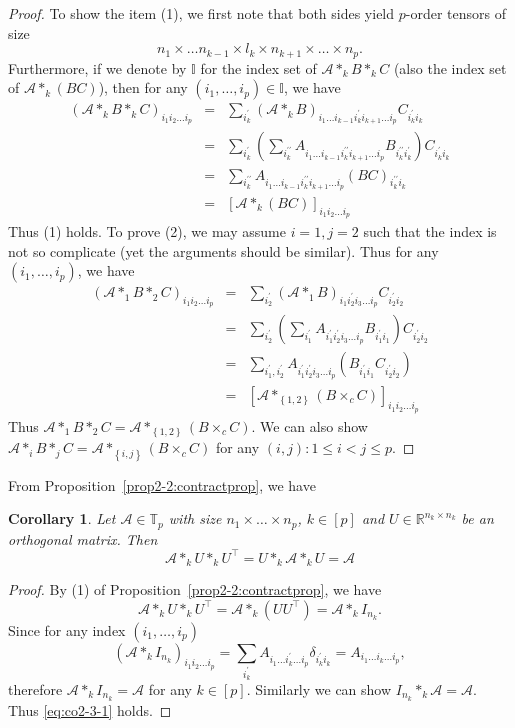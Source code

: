 \documentclass[11pt, oneside]{article}  %
\newtheorem{cor}[thm]{Corollary}
\newcommand{\set}[1]{\left\{#1\right\}}
\newcommand{\p}{\prime}
\newcommand{\bbI}{\mathbb{I}}
\newcommand{\RR}{\mathbb{R}}
\newcommand{\TT}{\mathbb{T}}
\newcommand{\A}{\mathcal{A}}
\newcommand{\beq}{\begin{equation}}
\newcommand{\eeq}{\end{equation}}
\newcommand{\beyy}{\begin{eqnarray*}}
\newcommand{\eeyy}{\end{eqnarray*}}
\begin{document}
\begin{proof}
To show the item (1), we first note that both sides yield $p$-order tensors of size 
\[ n_{1}\times\ldots n_{k-1}\times l_{k}\times n_{k+1}\times  \ldots \times n_{p}. \]
Furthermore, if we denote by $\bbI$ for the index set of $\A\ast_{k} B\ast_{k} C$ (also the index set of $\A\ast_{k} (BC)$), then for any 
$(i_{1},\ldots,i_{p})\in \bbI$, we have 
\beyy
(\A\ast_{k}B\ast_{k} C)_{i_{1}i_{2}\ldots i_{p}} 
&=& \sum_{i_{k}^{\p}}(\A\ast_{k}B)_{i_{1}\ldots i_{k-1}i_{k}^{\p}i_{k+1}\ldots i_{p}} C_{i_{k}^{\p}i_{k}}\\
&=& \sum_{i_{k}^{\p}}\left(\sum_{i_{k}^{\p\p}} A_{i_{1}\ldots i_{k-1}i_{k}^{\p\p}i_{k+1}\ldots i_{p}}
B_{i_{k}^{\p\p} i_{k}^{\p}} \right) C_{i_{k}^{\p}i_{k}}\\ 
&=&\sum_{i_{k}^{\p\p}} A_{i_{1}\ldots i_{k-1}i_{k}^{\p\p}i_{k+1}\ldots i_{p}} (BC)_{i_{k}^{\p\p}i_{k}}\\
& =&\left[ \A\ast_{k}(BC)\right]_{i_{1}i_{2}\ldots i_{p}} 
\eeyy
Thus (1) holds.  To prove (2), we may assume $i=1,j=2$ such that the index is not so complicate (yet the arguments should be similar).
Thus for any $(i_{1}, \ldots, i_{p})$, we have 
\beyy
(\A\ast_{1}B\ast_{2} C)_{i_{1}i_{2}\ldots i_{p}} 
&=&\sum_{i_{2}^{\p}}(\A\ast_{1}B)_{i_{1}i_{2}^{\p}i_{3}\ldots i_{p}}C_{i_{2}^{\p}i_{2}}\\
& =&\sum_{i_{2}^{\p}}\left( \sum_{i_{1}^{\p}} A_{i_{1}^{\p}i_{2}^{\p}i_{3}\ldots i_{p}} B_{i_{1}^{\p} i_{1}} \right) C_{i_{2}^{\p}i_{2}}\\
& =&\sum_{i_{1}^{\p},i_{2}^{\p}}A_{i_{1}^{\p}i_{2}^{\p}i_{3}\ldots i_{p}}\left( B_{i_{1}^{\p}i_{1}}C_{i_{2}^{\p}i_{2}}\right)\\
& =&\left[\A\ast_{\set{1,2}} (B\times_{c} C)\right]_{i_{1}i_{2}\ldots i_{p}}
\eeyy 
Thus $\A\ast_{1} B\ast_{2}C=\A\ast_{\set{1,2}}(B\times_{c} C)$. We can also show 
$\A\ast_{i} B\ast_{j}C=\A\ast_{\set{i,j}}(B\times_{c} C)$ for any $(i,j)\colon 1\le i<j\le p$. 
\end{proof}

From Proposition~\ref{prop2-2:contractprop}, we have  
\begin{cor}\label{co2-3}
Let $\A\in\TT_{p}$ with size $n_{1}\times\ldots\times n_{p}$, $k\in [p]$ and $U\in\RR^{n_{k}\times n_{k}}$ be an orthogonal matrix. Then 
\beq\label{eq:co2-3-1}
 \A\ast_{k} U\ast_{k} U^{\top} = U\ast_{k} \A \ast_{k} U = \A 
\eeq
\end{cor}

\begin{proof}
By (1) of Proposition~\ref{prop2-2:contractprop}, we have 
\[
 \A\ast_{k} U\ast_{k} U^{\top} = \A\ast_{k} (U U^{\top}) = \A\ast_{k} I_{n_{k}}.
\]
Since for any index $(i_{1},\ldots, i_{p})$
\[
\left( \A\ast_{k} I_{n_{k}}\right)_{i_{1}i_{2}\ldots i_{p}} = 
\sum_{i^{\p}_{k}} A_{i_{1}\ldots i^{\p}_{k}\ldots i_{p}} \delta_{i^{\p}_{k} i_{k}} = A_{i_{1}\ldots i_{k}\ldots i_{p}},
\]
therefore $\A\ast_{k} I_{n_{k}} = \A$ for any $k\in [p]$.  Similarly we can show $I_{n_{k}}\ast_{k} \A = \A$. Thus \eqref{eq:co2-3-1}
holds.
\end{proof}
\end{document}
